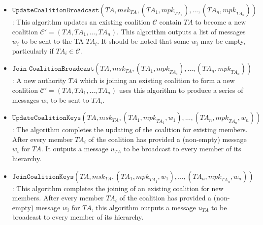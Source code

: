 \documentclass[10pt]{article}
\newcommand{\TA}{\mathit{TA}}
\newcommand{\mpk}{\mathit{mpk}}
\newcommand{\msk}{\mathit{msk}}
\begin{document}
\begin{itemize}
%

\item $\texttt{UpdateCoalitionBroadcast}(\TA,\msk_{\TA},(\TA_{1},\mpk_{\TA_{1}}),\ldots,
(\TA_{n},\mpk_{\TA_{n}}))$: This algorithm updates an existing
coalition $\mathcal{C}$ contain $\TA$ to become a new coalition
$\mathcal{C}'=(\TA,\TA_{1},\ldots,\TA_{n})$. This algorithm outputs
a list of messages $w_{i}$ to be sent to the TA $\TA_{i}$. It should
be noted that some $w_{i}$ may be empty, particularly if $\TA_{i}\in
\mathcal{C}$.\medskip

\item $\texttt{Join CoalitionBroadcast}(\TA,\msk_{\TA},(\TA_{1},\mpk_{\TA_{1}}),\ldots,
(\TA_{n},\mpk_{\TA_{n}}))$: A new authority $\TA$ which is joining
an existing coalition to form a new coalition
$\mathcal{C}'=(\TA,\TA_{1},\ldots,\TA_{n})$ uses this algorithm to
produce a series of messages $w_{i}$ to be sent to
$\TA_{i}$.\medskip

\item $\texttt{UpdateCoalitionKeys}(\TA,\msk_{\TA},(\TA_{1},\mpk_{\TA_{1}},w_{1}),\ldots,
(\TA_{n},\mpk_{\TA_{n}},w_{n}))$: The algorithm completes the
updating of the coalition for existing members. After every member
$\TA_{i}$ of the coalition has provided a (non-empty) message
$w_{i}$ for $\TA$. It outputs a message $u_{\TA}$ to be broadcast to
every member of its hierarchy.\medskip

\item $\texttt{JoinCoalitionKeys}(\TA,\msk_{\TA},(\TA_{1},\mpk_{\TA_{1}},w_{1}),\ldots,
(\TA_{n},\mpk_{\TA_{n}},w_{n}))$: This algorithm completes the
joining of an existing coalition for new members. After every member
$\TA_{i}$ of the coalition has provided a (non-empty) message
$w_{i}$ for $\TA$, this algorithm outputs a message $u_{\TA}$ to be
broadcast to every member of its hierarchy.
\end{itemize}
\end{document}
